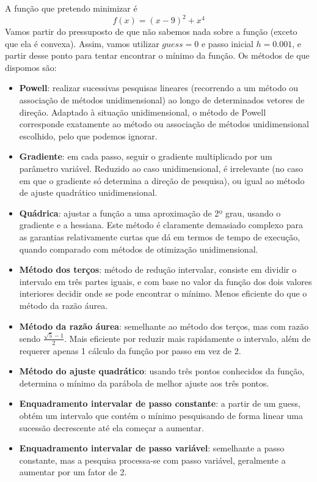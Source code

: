 \setcounter{chapter}{16}

A função que pretendo minimizar é
\begin{equation*}
    f(x)=(x-9)^2+x^4
\end{equation*}
Vamos partir do pressuposto de que não sabemos nada sobre a função (exceto que ela é convexa). Assim, vamos utilizar $guess=0$ e passo inicial $h=0.001$, e partir desse ponto para tentar encontrar o mínimo da função.
Os métodos de que dispomos são:
\begin{itemize}
    \item \textbf{Powell}: realizar sucessivas pesquisas lineares (recorrendo a um método ou associação de métodos unidimensional) ao longo de determinados vetores de direção. Adaptado à situação unidimensional, o método de Powell corresponde exatamente ao método ou associação de métodos unidimensional escolhido, pelo que podemos ignorar.
    \item \textbf{Gradiente}: em cada passo, seguir o gradiente multiplicado por um parâmetro variável. Reduzido ao caso unidimensional, é irrelevante (no caso em que o gradiente só determina a direção de pesquisa), ou igual ao método de ajuste quadrático unidimensional.
    \item \textbf{Quádrica}: ajustar a função a uma aproximação de 2º grau, usando o gradiente e a hessiana. Este método é claramente demasiado complexo para as garantias relativamente curtas que dá em termos de tempo de execução, quando comparado com métodos de otimização unidimensional.
    \item \textbf{Método dos terços}: método de redução intervalar, consiste em dividir o intervalo em três partes iguais, e com base no valor da função dos dois valores interiores decidir onde se pode encontrar o mínimo. Menos eficiente do que o método da razão áurea.
    \item \textbf{Método da razão áurea}: semelhante ao método dos terços, mas com razão sendo $\frac{\sqrt{5}-1}{2}$. Mais eficiente por reduzir mais rapidamente o intervalo, além de requerer apenas 1 cálculo da função por passo em vez de 2.
    \item \textbf{Método do ajuste quadrático}: usando três pontos conhecidos da função, determina o mínimo da parábola de melhor ajuste aos três pontos.
    \item \textbf{Enquadramento intervalar de passo constante}: a partir de um guess, obtém um intervalo que contém o mínimo pesquisando de forma linear uma sucessão decrescente até ela começar a aumentar.
    \item \textbf{Enquadramento intervalar de passo variável}: semelhante a passo constante, mas a pesquisa processa-se com passo variável, geralmente a aumentar por um fator de 2.
\end{itemize}
